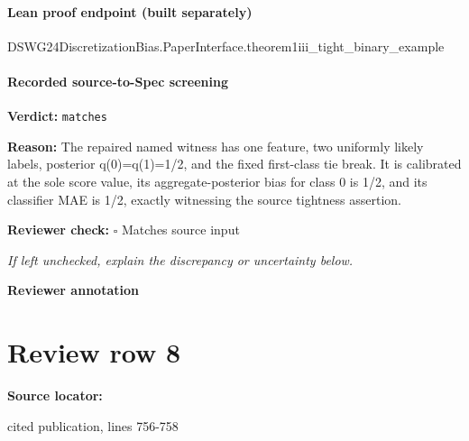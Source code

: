 \documentclass[10pt]{article}
\newcommand{\reviewerbox}{%
  \par\noindent\fbox{\parbox{0.96\linewidth}{\rule{0pt}{0.38in}}}\par
}
\newcommand{\reviewmatch}[1]{%
  \par\noindent\textbf{Reviewer check:} $\square$\; #1\par
  \noindent\emph{If left unchecked, explain the discrepancy or uncertainty below.}\par
}
\begin{document}
\paragraph{Lean proof endpoint (built separately)}\begin{ReviewVerbatim}
DSWG24DiscretizationBias.PaperInterface.theorem1iii_tight_binary_example
\end{ReviewVerbatim}

\paragraph{Recorded source-to-Spec screening}
\textbf{Verdict:} \texttt{matches}
\\
{\raggedright
\textbf{Reason:} The repaired named witness has one feature, two uniformly likely labels, posterior q(0)=q(1)=1/\allowbreak{}2, and the fixed first-\allowbreak{}class tie break.\allowbreak{} It is calibrated at the sole score value, its aggregate-\allowbreak{}posterior bias for class 0 is 1/\allowbreak{}2, and its classifier MAE is 1/\allowbreak{}2, exactly witnessing the source tightness assertion.\allowbreak{}
\par}
\reviewmatch{Matches source input}
\noindent\textbf{Reviewer annotation}\par
\reviewerbox
\clearpage
\hypertarget{source-claim-82ddd45159ec7ca3}{}
\section*{Review row 8}
\textbf{Source locator:} {\footnotesize\raggedright cited publication, lines 756-\allowbreak{}758\par}
\end{document}
